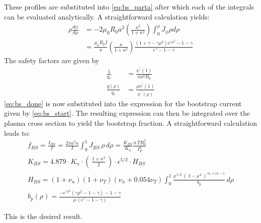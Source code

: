 These profiles are substituted into \cref{eq:bs_parta} after which each of the integrals can be evaluated analytically. A straightforward calculation yields:
\begin{equation}
\label{eq:bs_done}
\begin{aligned} \rho \frac { d \psi } { d \rho } & = - 2 \mu _ { 0 } R _ { 0 } a ^ { 2 } \left( \frac { \kappa ^ { 2 } } { 1 + \kappa ^ { 2 } } \right) \int _ { 0 } ^ { \rho } \overline { J } _ { \phi } \rho d \rho \\ & = \frac { \mu _ { 0 } R _ { 0 } I } { \pi } \left( \frac { \kappa } { 1 + \kappa ^ { 2 } } \right) \frac { \left( 1 + \gamma - \gamma \rho ^ { 2 } \right) e ^ { \gamma \rho ^ { 2 } } - 1 - \gamma } { e ^ { \gamma } - 1 - \gamma } \end{aligned}
\end{equation}
The safety factors are given by
\begin{equation}
\begin{aligned} \frac { 1 } { q _ { * } } & = \frac { \psi ^ { \prime } ( 1 ) } { \kappa a ^ { 2 } B _ { 0 } } \\ \frac { q ( \rho ) } { q _ { * } } & = \frac { \rho \psi ^ { \prime } ( 1 ) } { \psi ^ { \prime } ( \rho ) } \end{aligned}
\end{equation}
\cref{eq:bs_done} is now substituted into the expression for the bootstrap current given by \cref{eq:bs_start}. The resulting expression can then be integrated over the plasma cross section to yield the bootstrap fraction. A straightforward calculation leads to:
\begin{gather}
	f_{BS} = \frac{I_{BS}}{I} = \frac{ 2 \pi a^2 \kappa }{I} \int_0^1 J_{BS} \, \rho \, d\rho = \frac{ K_{BS} }{ K_n } \frac{\overline n \, \overline T R_0^2}{I_P^2} \\
  K_{BS} = 4.879 \cdot  K_n \cdot \left( \, \frac{1+\kappa^2}{2} \, \right) \cdot \epsilon^{5/2} \cdot H_{BS} \\
  H_{BS} = ( 1 + \nu_n ) ( 1 + \nu_T ) ( \nu_n + 0.054 \nu_T ) \int_0^1 \frac{ \rho^{\,5/2} \, ( \, 1 - \rho^{\,2} \, )^{\, \nu_n + \nu_T - 1} }{b_p} \, d\rho \\
	b_p(\rho) = \frac{ -e^{\gamma\rho^2} ( \gamma\rho^2 - 1 - \gamma ) - 1 - \gamma }{\rho \,( e^\gamma - 1 - \gamma ) } 
\end{gather}

This is the desired result.
